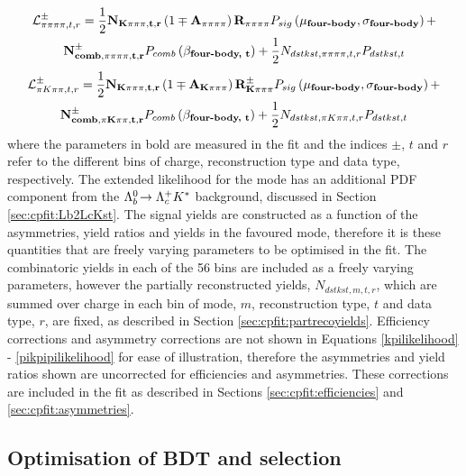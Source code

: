 \begin{multline}
\mathcal{L}_{\pi\pi\pi\pi, t, r}^{\pm} = \frac{1}{2}\mathbf{N_{K\pi\pi\pi, t, r}}\left(1 \mp \mathbf{A_{\pi\pi\pi\pi}}\right)\mathbf{R_{\pi\pi\pi\pi}} P_{sig}\left(\mathbf{\mu_\text{\textbf{four-body}}},\mathbf{\sigma_\text{\textbf{four-body}}}\right) + \\ \mathbf{N_{comb, \pi\pi\pi\pi, t, r}^{\pm}}P_{comb}\left(\mathbf{\beta_\text{\textbf{four-body, t}}}\right) + \frac{1}{2}N_{dstkst, \pi\pi\pi\pi, t, r}P_{dstkst, t}
\end{multline}
\begin{multline}
\mathcal{L}_{\pi K\pi\pi, t, r}^{\pm} = \frac{1}{2}\mathbf{N_{K\pi\pi\pi, t, r}}\left(1 \mp \mathbf{A_{K\pi\pi\pi}}\right)\mathbf{R_{K\pi\pi\pi}^{\pm}} P_{sig}\left(\mathbf{\mu_\text{\textbf{four-body}}},\mathbf{\sigma_\text{\textbf{four-body}}}\right) + \\ \mathbf{N_{comb, \pi K\pi\pi, t, r}^{\pm}}P_{comb}\left(\mathbf{\beta_\text{\textbf{four-body, t}}}\right) + \frac{1}{2}N_{dstkst, \pi K\pi\pi, t, r}P_{dstkst, t}
\label{pikpipilikelihood}
\end{multline}
where the parameters in bold are measured in the fit and the indices $\pm$, $t$ and $r$ refer to the different bins of \B charge, \KS reconstruction type and data type, respectively. The extended likelihood for the \kk mode has an additional PDF component from the ${{\Lambda}^0_{b}}\!\rightarrow {\ensuremath{{\Lambda}^+_{c}}}{\ensuremath{{K}^*}}$ background, discussed in Section \ref{sec:cpfit:Lb2LcKst}. The signal yields are constructed as a function of the asymmetries, yield ratios and yields in the favoured mode, therefore it is these quantities that are freely varying parameters to be optimised in the \CP fit. The combinatoric yields in each of the 56 bins are included as a freely varying parameters, however the partially reconstructed yields, $N_{dstkst, m, t, r}$, which are summed over charge in each bin of mode, $m$, \KS reconstruction type, $t$ and data type, $r$, are fixed, as described in Section \ref{sec:cpfit:partrecoyields}. Efficiency corrections and asymmetry corrections are not shown in Equations \ref{kpilikelihood} - \ref{pikpipilikelihood} for ease of illustration, therefore the asymmetries and yield ratios shown are uncorrected for efficiencies and asymmetries. These corrections are included in the \CP fit as described in Sections \ref{sec:cpfit:efficiencies} and \ref{sec:cpfit:asymmetries}.

\subsection{Optimisation of BDT and \Kstar selection}
\label{sec:cpfit:optimisation}


